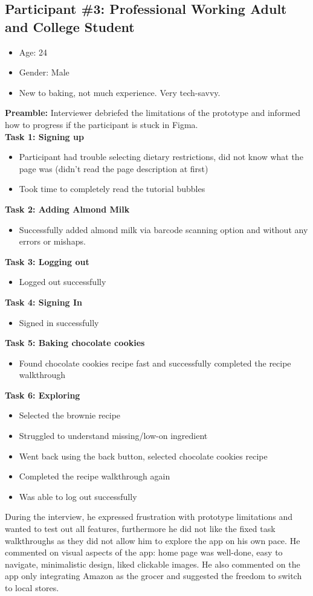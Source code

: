 \documentclass[manuscript, screen, nonacm]{acmart}
\begin{document}
\subsection{Participant \#3: Professional Working Adult and College Student}
\begin{itemize}
    \item Age: 24
    \item Gender: Male
    \item New to baking, not much experience. Very tech-savvy.
\end{itemize}
\textbf{Preamble:} Interviewer debriefed the limitations of the prototype and informed how to progress if the participant is stuck in Figma.\\
\textbf{Task 1: Signing up}
\begin{itemize}
    \item Participant had trouble selecting dietary restrictions, did not know what the page was (didn't read the page description at first)
    \item Took time to completely read the tutorial bubbles
\end{itemize}
\textbf{Task 2: Adding Almond Milk}
\begin{itemize}
    \item Successfully added almond milk via barcode scanning option and without any errors or mishaps.
\end{itemize}
\textbf{Task 3: Logging out}
\begin{itemize}
    \item Logged out successfully
\end{itemize}
\textbf{Task 4: Signing In}
\begin{itemize}
    \item Signed in successfully
\end{itemize}
\textbf{Task 5: Baking chocolate cookies}
\begin{itemize}
    \item Found chocolate cookies recipe fast and successfully completed the recipe walkthrough
\end{itemize}
\textbf{Task 6: Exploring}
\begin{itemize}
    \item Selected the brownie recipe
    \item Struggled to understand missing/low-on ingredient
    \item Went back using the back button, selected chocolate cookies recipe
    \item Completed the recipe walkthrough again
    \item Was able to log out successfully 
\end{itemize}
During the interview, he expressed frustration with prototype limitations and wanted to test out all features, furthermore he did not like the fixed task walkthroughs as they did not allow him to explore the app on his own pace. He commented on visual aspects of the app: home page was well-done, easy to navigate, minimalistic design, liked clickable images. He also commented on the app only integrating Amazon as the grocer and suggested the freedom to switch to local stores.
\end{document}

